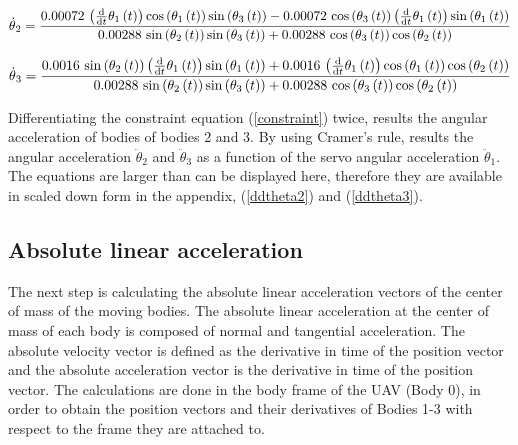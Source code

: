 \begin{equation}\label{dtheta2}
\dot{\theta}{_2} =	{\frac { 0.00072\, \left( {\frac {\rm d}{{\rm d}t}}\theta_{{1}}
 \left( t \right)  \right) \cos \left( \theta_{{1}} \left( t \right) 
 \right) \sin \left( \theta_{{3}} \left( t \right)  \right) - 0.00072
\,\cos \left( \theta_{{3}} \left( t \right)  \right)  \left( {\frac 
{\rm d}{{\rm d}t}}\theta_{{1}} \left( t \right)  \right) \sin \left( 
\theta_{{1}} \left( t \right)  \right) }{ 0.00288\,\sin \left( \theta_
{{2}} \left( t \right)  \right) \sin \left( \theta_{{3}} \left( t
 \right)  \right) + 0.00288\,\cos \left( \theta_{{3}} \left( t
 \right)  \right) \cos \left( \theta_{{2}} \left( t \right)  \right) }
}
\end{equation}

\begin{equation}\label{dtheta3}
\dot{\theta}{_3} =	{\frac { 0.0016\,\sin \left( \theta_{{2}} \left( t \right)  \right) 
 \left( {\frac {\rm d}{{\rm d}t}}\theta_{{1}} \left( t \right) 
 \right) \sin \left( \theta_{{1}} \left( t \right)  \right) + 0.0016\,
 \left( {\frac {\rm d}{{\rm d}t}}\theta_{{1}} \left( t \right) 
 \right) \cos \left( \theta_{{1}} \left( t \right)  \right) \cos
 \left( \theta_{{2}} \left( t \right)  \right) }{ 0.00288\,\sin
 \left( \theta_{{2}} \left( t \right)  \right) \sin \left( \theta_{{3}
} \left( t \right)  \right) + 0.00288\,\cos \left( \theta_{{3}}
 \left( t \right)  \right) \cos \left( \theta_{{2}} \left( t \right) 
 \right) }}
\end{equation}

Differentiating the constraint equation (\ref{constraint}) twice, results the angular acceleration of bodies of bodies 2 and 3. By using Cramer's rule, results the angular acceleration $\ddot{\theta}{_2}$ and $\ddot{\theta}{_3}$ as a function of the servo angular acceleration $\ddot{\theta}{_1}$. The equations are larger than can be displayed here, therefore they are available in scaled down form in the appendix,  (\ref{ddtheta2}) and  (\ref{ddtheta3}).

\subsection{Absolute linear acceleration}

The next step is calculating the absolute linear acceleration vectors of the center of mass of the moving bodies. The absolute linear acceleration at the center of mass of each body is composed of normal and tangential acceleration. 
The absolute velocity vector is defined as the derivative in time of the position vector and the absolute acceleration vector is the derivative in time of the position vector.
The calculations are done in the body frame of the UAV (Body 0), in order to obtain the position vectors and their derivatives of Bodies 1-3 with respect to the frame they are attached to. 

